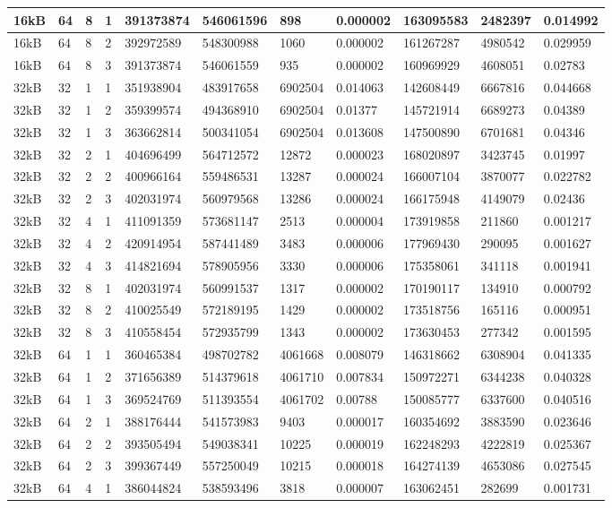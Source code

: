\documentclass[conference]{IEEEtran}
\begin{document}
\begin{table}
\begin{tabular}{|m{.75cm} |m{.75cm} |m{.8cm} | m{.75cm} | l | l | l | l | l | l | l |}
16kB&64&8&1&391373874&546061596&898&0.000002&163095583&2482397&0.014992\\ \hline
16kB&64&8&2&392972589&548300988&1060&0.000002&161267287&4980542&0.029959\\ \hline
16kB&64&8&3&391373874&546061559&935&0.000002&160969929&4608051&0.02783\\ \hline
32kB&32&1&1&351938904&483917658&6902504&0.014063&142608449&6667816&0.044668\\ \hline
32kB&32&1&2&359399574&494368910&6902504&0.01377&145721914&6689273&0.04389\\ \hline
32kB&32&1&3&363662814&500341054&6902504&0.013608&147500890&6701681&0.04346\\ \hline
32kB&32&2&1&404696499&564712572&12872&0.000023&168020897&3423745&0.01997\\ \hline
32kB&32&2&2&400966164&559486531&13287&0.000024&166007104&3870077&0.022782\\ \hline
32kB&32&2&3&402031974&560979568&13286&0.000024&166175948&4149079&0.02436\\ \hline
32kB&32&4&1&411091359&573681147&2513&0.000004&173919858&211860&0.001217\\ \hline
32kB&32&4&2&420914954&587441489&3483&0.000006&177969430&290095&0.001627\\ \hline
32kB&32&4&3&414821694&578905956&3330&0.000006&175358061&341118&0.001941\\ \hline
32kB&32&8&1&402031974&560991537&1317&0.000002&170190117&134910&0.000792\\ \hline
32kB&32&8&2&410025549&572189195&1429&0.000002&173518756&165116&0.000951\\ \hline
32kB&32&8&3&410558454&572935799&1343&0.000002&173630453&277342&0.001595\\ \hline
32kB&64&1&1&360465384&498702782&4061668&0.008079&146318662&6308904&0.041335\\ \hline
32kB&64&1&2&371656389&514379618&4061710&0.007834&150972271&6344238&0.040328\\ \hline
32kB&64&1&3&369524769&511393554&4061702&0.00788&150085777&6337600&0.040516\\ \hline
32kB&64&2&1&388176444&541573983&9403&0.000017&160354692&3883590&0.023646\\ \hline
32kB&64&2&2&393505494&549038341&10225&0.000019&162248293&4222819&0.025367\\ \hline
32kB&64&2&3&399367449&557250049&10215&0.000018&164274139&4653086&0.027545\\ \hline
32kB&64&4&1&386044824&538593496&3818&0.000007&163062451&282699&0.001731\\ \hline

\end{tabular}
\end{table}
\end{document}
